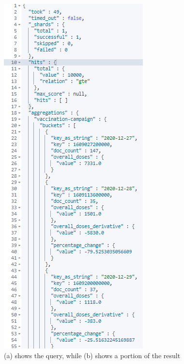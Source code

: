 \documentclass{article}[IEEEtran]
\begin{document}
\begin{figure}[H]
\begin{center}
\begin{minipage}[b]{0.4\textwidth}
    \includegraphics[width=\textwidth, frame]{Answer_Query_6.PNG}
     \subcaption{}
  \end{minipage}
  \caption{(a) shows the query, while (b) shows a portion of the result}
\end{center}
\end{figure}
\end{document}

